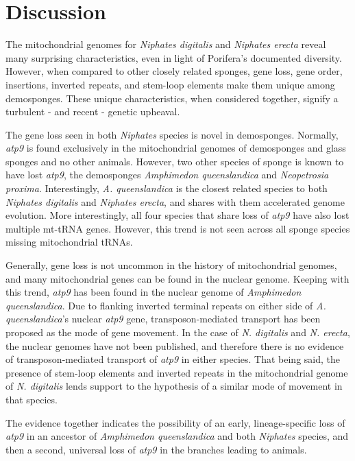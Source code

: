\documentclass[../main.tex]{subfiles}
\begin{document}
\section{Discussion}

The mitochondrial genomes for \emph{Niphates digitalis} and \emph{Niphates erecta} reveal many surprising characteristics, even in light of Porifera's documented diversity. However, when compared to other closely related sponges, gene loss, gene order, insertions, inverted repeats, and stem-loop elements make them unique among demosponges. These unique characteristics, when considered together, signify a turbulent - and recent - genetic upheaval. 

The gene loss seen in both \emph{Niphates} species is novel in demosponges. Normally, \emph{atp9} is found exclusively in the mitochondrial genomes of demosponges and glass sponges and no other animals. However, two other species of sponge is known to have lost \emph{atp9}, the demosponges \emph{Amphimedon queenslandica} and \emph{Neopetrosia proxima}. Interestingly, \emph{A. queenslandica} is the closest related species to both \emph{Niphates digitalis} and \emph{Niphates erecta}, and shares with them accelerated genome evolution. More interestingly, all four species that share loss of \emph{atp9} have also lost multiple mt-tRNA genes. However, this trend is not seen across all sponge species missing mitochondrial tRNAs.

Generally, gene loss is not uncommon in the history of mitochondrial genomes, and many mitochondrial genes can be found in the nuclear genome. Keeping with this trend, \emph{atp9} has been found in the nuclear genome of \emph{Amphimedon queenslandica}. Due to flanking inverted terminal repeats on either side of \emph{A. queenslandica}'s nuclear \emph{atp9} gene, transposon-mediated transport has been proposed as the mode of gene movement. In the case of \emph{N. digitalis} and \emph{N. erecta}, the nuclear genomes have not been published, and therefore there is no evidence of transposon-mediated transport of \emph{atp9} in either species. That being said, the presence of stem-loop elements and inverted repeats in the mitochondrial genome of \emph{N. digitalis} lends support to the hypothesis of a similar mode of movement in that species. 

The evidence together indicates the possibility of an early, lineage-specific loss of \emph{atp9} in an ancestor of \emph{Amphimedon queenslandica} and both \emph{Niphates} species, and then a second, universal loss of \emph{atp9} in the branches leading to animals. 
\end{document}
